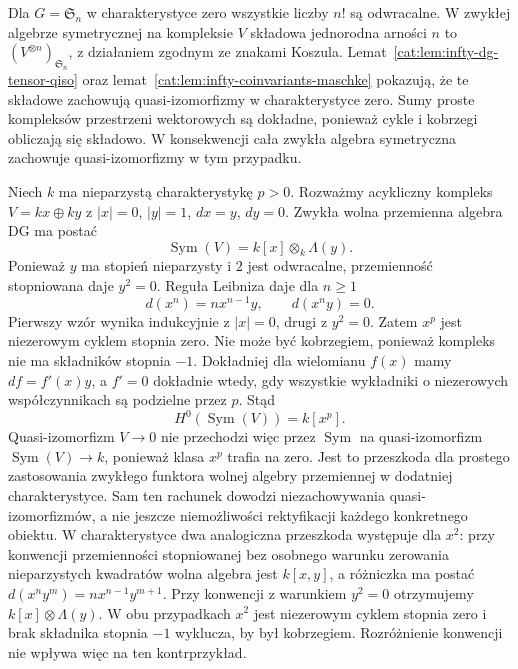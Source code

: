Dla $G=\mathfrak S_n$ w charakterystyce zero wszystkie liczby $n!$ są odwracalne. W zwykłej algebrze symetrycznej na kompleksie $V$ składowa jednorodna arności $n$ to $(V^{\otimes n})_{\mathfrak S_n}$, z działaniem zgodnym ze znakami Koszula. Lemat~\ref{cat:lem:infty-dg-tensor-qiso} oraz lemat~\ref{cat:lem:infty-coinvariants-maschke} pokazują, że te składowe zachowują quasi-izomorfizmy w charakterystyce zero. Sumy proste kompleksów przestrzeni wektorowych są dokładne, ponieważ cykle i kobrzegi obliczają się składowo. W konsekwencji cała zwykła algebra symetryczna zachowuje quasi-izomorfizmy w tym przypadku.

\begin{przyklad}\label{cat:ex:infty-positive-char-symmetric}
Niech $k$ ma nieparzystą charakterystykę $p>0$. Rozważmy acykliczny kompleks $V=kx\oplus ky$ z $|x|=0$, $|y|=1$, $dx=y$, $dy=0$. Zwykła wolna przemienna algebra DG ma postać
\[
 \operatorname{Sym}(V)=k[x]\otimes_k\Lambda(y).
\]
Ponieważ $y$ ma stopień nieparzysty i $2$ jest odwracalne, przemienność stopniowana daje $y^2=0$. Reguła Leibniza daje dla $n\geq1$
\[
 d(x^n)=n x^{n-1}y,\qquad d(x^n y)=0.
\]
Pierwszy wzór wynika indukcyjnie z $|x|=0$, drugi z $y^2=0$. Zatem $x^p$ jest niezerowym cyklem stopnia zero. Nie może być kobrzegiem, ponieważ kompleks nie ma składników stopnia $-1$. Dokładniej dla wielomianu $f(x)$ mamy $df=f'(x)y$, a $f'=0$ dokładnie wtedy, gdy wszystkie wykładniki o niezerowych współczynnikach są podzielne przez $p$. Stąd
\[
 H^0(\operatorname{Sym}(V))=k[x^p].
\]
Quasi-izomorfizm $V\to0$ nie przechodzi więc przez $\operatorname{Sym}$ na quasi-izomorfizm $\operatorname{Sym}(V)\to k$, ponieważ klasa $x^p$ trafia na zero. Jest to przeszkoda dla prostego zastosowania zwykłego funktora wolnej algebry przemiennej w dodatniej charakterystyce. Sam ten rachunek dowodzi niezachowywania quasi-izomorfizmów, a nie jeszcze niemożliwości rektyfikacji każdego konkretnego obiektu. W charakterystyce dwa analogiczna przeszkoda występuje dla $x^2$: przy konwencji przemienności stopniowanej bez osobnego warunku zerowania nieparzystych kwadratów wolna algebra jest $k[x,y]$, a różniczka ma postać $d(x^ny^m)=nx^{n-1}y^{m+1}$. Przy konwencji z warunkiem $y^2=0$ otrzymujemy $k[x]\otimes\Lambda(y)$. W obu przypadkach $x^2$ jest niezerowym cyklem stopnia zero i brak składnika stopnia $-1$ wyklucza, by był kobrzegiem. Rozróżnienie konwencji nie wpływa więc na ten kontrprzykład.
\end{przyklad}

